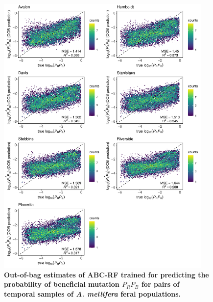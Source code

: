 \documentclass[a4paper, 12pt]{article}
\begin{document}
\begin{figure}[ht]
 \centering
 \includegraphics[width=0.95\textwidth]{Figures/FigureS18_combined_plot_prps.pdf}
 \small\caption{\textbf{Out-of-bag estimates of ABC-RF trained for predicting the probability of beneficial mutation $P_RP_B$ for pairs of temporal samples of \textit{A. mellifera} feral populations.}}
 \label{fig:supple_feralbee_prpb}
\end{figure}
\end{document}
